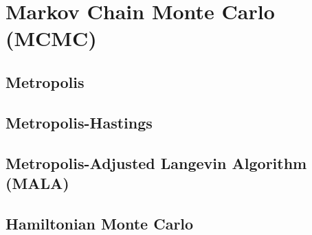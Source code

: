 \documentclass{article}
\begin{document}
\section{Markov Chain Monte Carlo (MCMC)}
\subsection{Metropolis}
\subsection{Metropolis-Hastings}
\subsection{Metropolis-Adjusted Langevin Algorithm (MALA)}
\subsection{Hamiltonian Monte Carlo}







% 
% 
\end{document}

